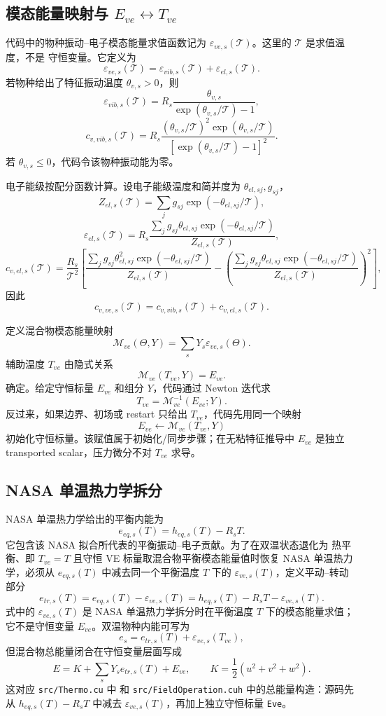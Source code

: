 \documentclass[11pt,a4paper,fontset=fandol]{ctexart}
\newcommand{\ve}{ve}
\newcommand{\tr}{tr}
\newcommand{\Tmode}{\mathcal{T}}
\newcommand{\Mve}{\mathcal{M}_{\ve}}
\newcommand{\code}[1]{\texttt{\seqsplit{#1}}}
\begin{document}
\subsection{\texorpdfstring{模态能量映射与 \(E_{\ve}\leftrightarrow T_{\ve}\)}{模态能量映射与 Eve-Tve}}

代码中的物种振动--电子模态能量求值函数记为
\(\varepsilon_{\ve,s}(\Tmode)\)。这里的 \(\Tmode\) 是求值温度，不是
守恒变量。它定义为
\[
\varepsilon_{\ve,s}(\Tmode)=\varepsilon_{vib,s}(\Tmode)+\varepsilon_{el,s}(\Tmode).
\]
若物种给出了特征振动温度 \(\theta_{v,s}>0\)，则
\[
\varepsilon_{vib,s}(\Tmode)=
R_s\frac{\theta_{v,s}}{\exp(\theta_{v,s}/\Tmode)-1},
\]
\[
c_{v,vib,s}(\Tmode)=
R_s
\frac{(\theta_{v,s}/\Tmode)^2\exp(\theta_{v,s}/\Tmode)}
{\left[\exp(\theta_{v,s}/\Tmode)-1\right]^2}.
\]
若 \(\theta_{v,s}\le0\)，代码令该物种振动能为零。

电子能级按配分函数计算。设电子能级温度和简并度为
\(\theta_{el,sj},g_{sj}\)，
\[
Z_{el,s}(\Tmode)=\sum_j g_{sj}\exp(-\theta_{el,sj}/\Tmode),
\]
\[
\varepsilon_{el,s}(\Tmode)=
R_s\frac{\sum_jg_{sj}\theta_{el,sj}
\exp(-\theta_{el,sj}/\Tmode)}
{Z_{el,s}(\Tmode)},
\]
\[
c_{v,el,s}(\Tmode)=
\frac{R_s}{\Tmode^2}
\left[
\frac{\sum_jg_{sj}\theta_{el,sj}^2
\exp(-\theta_{el,sj}/\Tmode)}{Z_{el,s}(\Tmode)}
-\left(
\frac{\sum_jg_{sj}\theta_{el,sj}
\exp(-\theta_{el,sj}/\Tmode)}{Z_{el,s}(\Tmode)}
\right)^2
\right],
\]
因此
\[
c_{v,\ve,s}(\Tmode)=c_{v,vib,s}(\Tmode)+c_{v,el,s}(\Tmode).
\]

定义混合物模态能量映射
\[
\Mve(\Theta,Y)=\sum_sY_s\varepsilon_{\ve,s}(\Theta).
\]
辅助温度 \(T_{\ve}\) 由隐式关系
\[
\boxed{\Mve(T_{\ve},Y)=E_{\ve}}.
\]
确定。给定守恒标量 \(E_{\ve}\) 和组分 \(Y\)，代码通过 Newton 迭代求
\[
T_{\ve}=\Mve^{-1}(E_{\ve};Y).
\]
反过来，如果边界、初场或 restart 只给出 \(T_{\ve}\)，代码先用同一个映射
\[
E_{\ve}\leftarrow \Mve(T_{\ve},Y)
\]
初始化守恒标量。该赋值属于初始化/同步步骤；在无粘特征推导中
\(E_{\ve}\) 是独立 transported scalar，压力微分不对 \(T_{\ve}\) 求导。

\subsection{NASA 单温热力学拆分}

NASA 单温热力学给出的平衡内能为
\[
e_{eq,s}(T)=h_{eq,s}(T)-R_sT .
\]
它包含该 NASA 拟合所代表的平衡振动--电子贡献。为了在双温状态退化为
热平衡、即 \(T_{\ve}=T\) 且守恒 VE 标量取混合物平衡模态能量值时恢复
NASA 单温热力学，必须从
\(e_{eq,s}(T)\) 中减去同一个平衡温度 \(T\) 下的
\(\varepsilon_{\ve,s}(T)\)，定义平动--转动部分
\[
e_{\tr,s}(T)=e_{eq,s}(T)-\varepsilon_{\ve,s}(T)
=h_{eq,s}(T)-R_sT-\varepsilon_{\ve,s}(T).
\]
式中的 \(\varepsilon_{\ve,s}(T)\) 是 NASA 单温热力学拆分时在平衡温度
\(T\) 下的模态能量求值；它不是守恒变量 \(E_{\ve}\)。双温物种内能可写为
\[
e_s=e_{\tr,s}(T)+\varepsilon_{\ve,s}(T_{\ve}),
\]
但混合物总能量闭合在守恒变量层面写成
\[
E=K+\sum_sY_s e_{\tr,s}(T)+E_{\ve},
\qquad
K=\frac{1}{2}(u^2+v^2+w^2).
\]
这对应 \texttt{src/Thermo.cu} 中
\code{compute\_mixture\_tr\_energy} 和
\texttt{src/FieldOperation.cuh} 中的总能量构造：源码先从
\(h_{eq,s}(T)-R_sT\) 中减去 \(\varepsilon_{\ve,s}(T)\)，再加上独立守恒标量
\texttt{Eve}。
\end{document}
